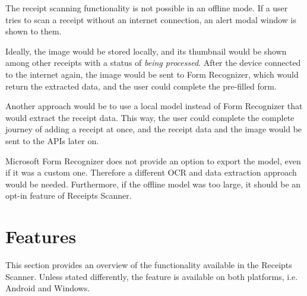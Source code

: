 \documentclass[
  printed, %
  table,   %
  oneside, %
  lof,     %
  lot,     %
]{fithesis3}
\begin{document}
The receipt scanning functionality is not possible in an offline mode. If a user tries to scan a receipt without an internet connection, an alert modal window is shown to them.

Ideally, the image would be stored locally, and its thumbnail would be shown among other receipts with a status of \textit{being processed}. After the device connected to the internet again, the image would be sent to Form Recognizer, which would return the extracted data, and the user could complete the pre-filled form.

Another approach would be to use a local model instead of Form Recognizer that would extract the receipt data. This way, the user could complete the complete journey of adding a receipt at once, and the receipt data and the image would be sent to the APIs later on.

Microsoft Form Recognizer does not provide an option to export the model, even if it was a custom one. Therefore a different OCR and data extraction approach would be needed. Furthermore, if the offline model was too large, it should be an opt-in feature of Receipts Scanner.

\section{Features}
This section provides an overview of the functionality available in the Receipts Scanner. Unless stated differently, the feature is available on both platforms, i.e. Android and Windows.
\end{document}
